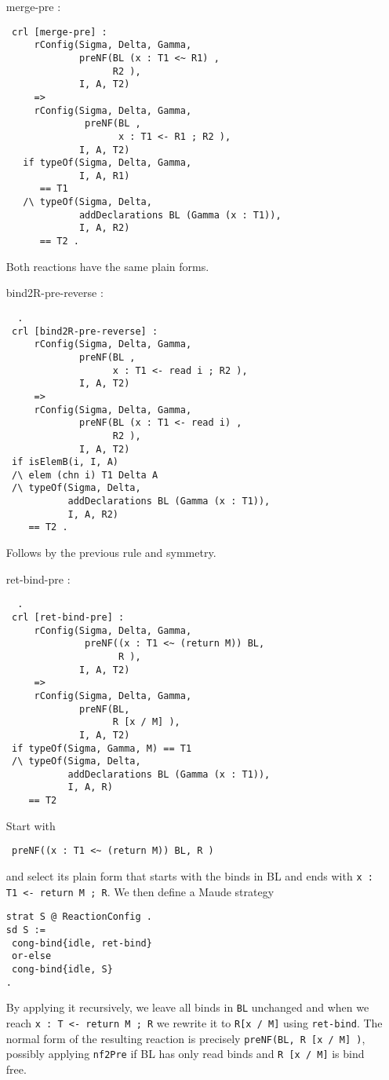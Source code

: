 \documentclass{article}
\begin{document}
\begin{itemize}
\item[merge-pre]:
\begin{lstlisting}
 crl [merge-pre] :
     rConfig(Sigma, Delta, Gamma, 
             preNF(BL (x : T1 <~ R1) , 
                   R2 ), 
             I, A, T2)
     =>
     rConfig(Sigma, Delta, Gamma, 
              preNF(BL , 
                    x : T1 <- R1 ; R2 ), 
             I, A, T2) 
   if typeOf(Sigma, Delta, Gamma, 
             I, A, R1) 
      == T1
   /\ typeOf(Sigma, Delta, 
             addDeclarations BL (Gamma (x : T1)), 
             I, A, R2) 
      == T2 .
       \end{lstlisting} 
       
 Both reactions have the same plain forms.      
  
\item[bind2R-pre-reverse]:
\begin{lstlisting}  .    
 crl [bind2R-pre-reverse] :
     rConfig(Sigma, Delta, Gamma, 
             preNF(BL , 
                   x : T1 <- read i ; R2 ), 
             I, A, T2)
     =>
     rConfig(Sigma, Delta, Gamma, 
             preNF(BL (x : T1 <- read i) , 
                   R2 ),
             I, A, T2) 
 if isElemB(i, I, A)  
 /\ elem (chn i) T1 Delta A 
 /\ typeOf(Sigma, Delta, 
           addDeclarations BL (Gamma (x : T1)), 
           I, A, R2) 
    == T2 .  
          \end{lstlisting} 
          
  Follows by the previous rule and symmetry.        
 
\item[ret-bind-pre]:
\begin{lstlisting}  .  
 crl [ret-bind-pre] :
     rConfig(Sigma, Delta, Gamma, 
              preNF((x : T1 <~ (return M)) BL, 
                    R ), 
             I, A, T2) 
     =>
     rConfig(Sigma, Delta, Gamma, 
             preNF(BL, 
                   R [x / M] ), 
             I, A, T2) 
 if typeOf(Sigma, Gamma, M) == T1 
 /\ typeOf(Sigma, Delta, 
           addDeclarations BL (Gamma (x : T1)), 
           I, A, R) 
    == T2 
          \end{lstlisting} 
 

 Start with 
  \begin{lstlisting}
 preNF((x : T1 <~ (return M)) BL, R )
 \end{lstlisting} 
 \noindent and select its 
 plain form that starts with the binds in BL and ends with \verb+x : T1 <- return M ; R+.
We then define a Maude strategy 
\begin{lstlisting}
strat S @ ReactionConfig .
sd S := 
 cong-bind{idle, ret-bind}
 or-else
 cong-bind{idle, S}
.
     \end{lstlisting}
By applying it recursively, we leave all binds in \verb+BL+ unchanged and 
when we reach
\verb+x : T <- return M ; R+ we rewrite it to \verb+R[x / M]+ 
using \verb+ret-bind+. 
The normal form of the resulting reaction is precisely
\verb+preNF(BL, R [x / M] )+, possibly applying \verb+nf2Pre+ if BL has only
read binds and \verb+R [x / M]+ is bind free.
 

\end{itemize}
\end{document}
